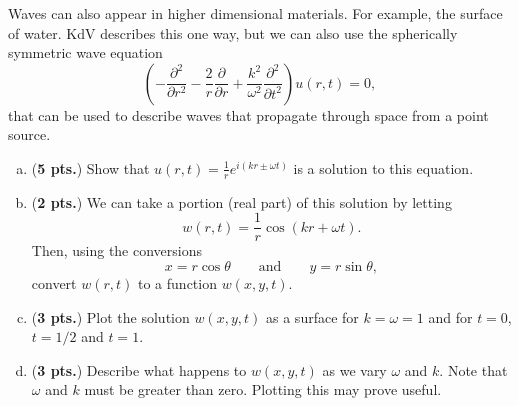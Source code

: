 \documentclass[12pt]{amsbook}
\begin{document}
\newpage
\begin{problem} 
Waves can also appear in higher dimensional materials.  For example, the surface of water. KdV describes this one way, but we can also use the spherically symmetric wave equation
\[
\left(-\frac{\partial^2}{\partial r^2} - \frac{2}{r} \frac{\partial}{\partial r} +\frac{k^2}{\omega^2}\frac{\partial^2}{\partial t^2} \right) u(r,t) = 0,
\]
that can be used to describe waves that propagate through space from a point source.
\vspace*{.5cm}
\begin{enumerate}[(a)]
    \item (\textbf{5 pts.}) Show that $u(r,t) = \frac{1}{r}e^{i(kr\pm\omega t)}$ is a solution to this equation.
    \vspace*{.5cm}
    \item (\textbf{2 pts.}) We can take a portion (real part) of this solution by letting
    \[
    w(r,t) = \frac{1}{r} \cos(kr+\omega t).
    \]
    Then, using the conversions
    \[
    x = r\cos \theta \qquad \textrm{and} \qquad y = r\sin \theta,
    \]
    convert $w(r,t)$ to a function $w(x,y,t)$.
    \vspace*{.5cm}
    \item (\textbf{3 pts.}) Plot the solution $w(x,y,t)$ as a surface for $k=\omega = 1$ and for $t=0$, $t=1/2$ and $t=1$.  
    \vspace*{.5cm}
    \item (\textbf{3 pts.}) Describe what happens to $w(x,y,t)$ as we vary $\omega$ and $k$.  Note that $\omega$ and $k$ must be greater than zero. Plotting this may prove useful.
    
\end{enumerate}
\end{problem}
\end{document}
